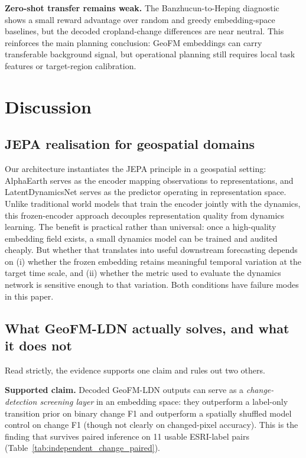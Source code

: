 \documentclass{article}
\begin{document}
\textbf{Zero-shot transfer remains weak.} The Banzhucun-to-Heping diagnostic shows a small reward advantage over random and greedy embedding-space baselines, but the decoded cropland-change differences are near neutral. This reinforces the main planning conclusion: GeoFM embeddings can carry transferable background signal, but operational planning still requires local task features or target-region calibration.



\section{Discussion}
\label{sec:discussion}

\subsection{JEPA realisation for geospatial domains}

Our architecture instantiates the JEPA principle in a geospatial setting: AlphaEarth serves as the encoder mapping observations to representations, and LatentDynamicsNet serves as the predictor operating in representation space. Unlike traditional world models that train the encoder jointly with the dynamics, this frozen-encoder approach decouples representation quality from dynamics learning. The benefit is practical rather than universal: once a high-quality embedding field exists, a small dynamics model can be trained and audited cheaply. But whether that translates into useful downstream forecasting depends on (i) whether the frozen embedding retains meaningful temporal variation at the target time scale, and (ii) whether the metric used to evaluate the dynamics network is sensitive enough to that variation. Both conditions have failure modes in this paper.

\subsection{What GeoFM-LDN actually solves, and what it does not}

Read strictly, the evidence supports one claim and rules out two others.

\textbf{Supported claim.} Decoded GeoFM-LDN outputs can serve as a \emph{change-detection screening layer} in an embedding space: they outperform a label-only transition prior on binary change F1 and outperform a spatially shuffled model control on change F1 (though not clearly on changed-pixel accuracy). This is the finding that survives paired inference on 11 usable ESRI-label pairs (Table~\ref{tab:independent_change_paired}).
\end{document}

